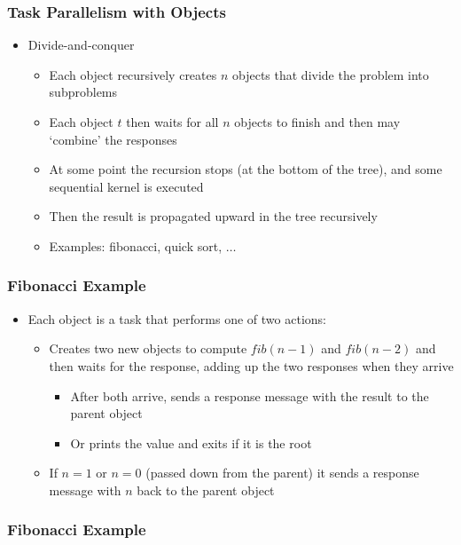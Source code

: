 \begin{frame}[fragile]
  \frametitle{Task Parallelism with Objects}
  \begin{itemize}
    \item Divide-and-conquer
      \begin{itemize}
      \item Each object recursively creates $n$ objects that divide the problem
        into subproblems
      \item Each object $t$ then waits for all $n$ objects to finish and then may
        `combine' the responses
      \item At some point the recursion stops (at the bottom of the tree), and
        some sequential kernel is executed
      \item Then the result is propagated upward in the tree recursively
      \item Examples: fibonacci, quick sort, $\ldots$
      \end{itemize}
  \end{itemize}
\end{frame}

\begin{frame}[fragile]
  \frametitle{Fibonacci Example}
  \begin{itemize}
    \item Each  object is a task that performs one of two actions:
      \begin{itemize}
        \item Creates two new  objects to compute $fib(n-1)$ and
          $fib(n-2)$ and then waits for the response, adding up the two
          responses when they arrive
          \begin{itemize}
          \item After both arrive, sends a response message with the result to
            the parent object
          \item Or prints the value and exits if it is the root
          \end{itemize}
        \item If $n = 1$ or $n = 0$ (passed down from the parent) it sends a
          response message with $n$ back to the parent object
      \end{itemize}
  \end{itemize}
\end{frame}

\begin{frame}[fragile]
  \frametitle{Fibonacci Example}
  
\end{frame}

